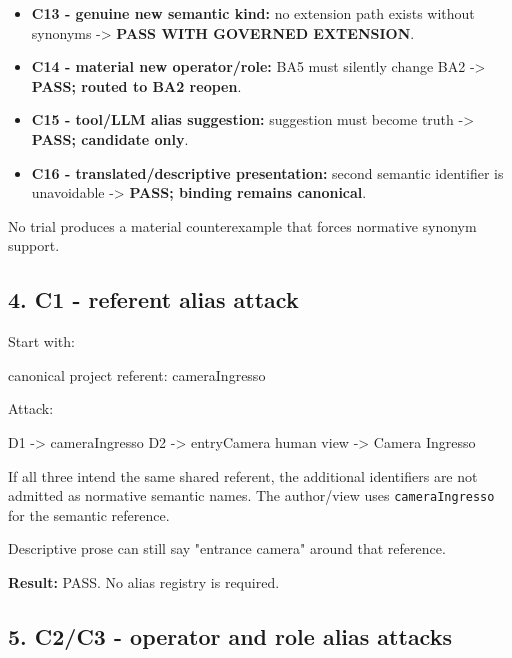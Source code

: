 \documentclass[
  10pt,
  a4paper,
]{article}
\newenvironment{Shaded}{}{}
\newcommand{\NormalTok}[1]{#1}
\begin{document}
\begin{itemize}
\item
  \textbf{C13 - genuine new semantic kind:} no extension path exists
  without synonyms -\textgreater{} \textbf{PASS WITH GOVERNED
  EXTENSION}.
\item
  \textbf{C14 - material new operator/role:} BA5 must silently change
  BA2 -\textgreater{} \textbf{PASS; routed to BA2 reopen}.
\item
  \textbf{C15 - tool/LLM alias suggestion:} suggestion must become truth
  -\textgreater{} \textbf{PASS; candidate only}.
\item
  \textbf{C16 - translated/descriptive presentation:} second semantic
  identifier is unavoidable -\textgreater{} \textbf{PASS; binding
  remains canonical}.
\end{itemize}

No trial produces a material counterexample that forces normative
synonym support.

\subsection{4. C1 - referent alias
attack}\label{4-c1---referent-alias-attack}

Start with:

\begin{Shaded}
\begin{Highlighting}[]
\NormalTok{canonical project referent:}
\NormalTok{  cameraIngresso}
\end{Highlighting}
\end{Shaded}

Attack:

\begin{Shaded}
\begin{Highlighting}[]
\NormalTok{D1 {-}\textgreater{} cameraIngresso}
\NormalTok{D2 {-}\textgreater{} entryCamera}
\NormalTok{human view {-}\textgreater{} Camera Ingresso}
\end{Highlighting}
\end{Shaded}

If all three intend the same shared referent, the additional identifiers
are not admitted as normative semantic names. The author/view uses
\texttt{cameraIngresso} for the semantic reference.

Descriptive prose can still say "entrance camera" around that reference.

\textbf{Result:} PASS. No alias registry is required.

\subsection{5. C2/C3 - operator and role alias
attacks}\label{5-c2c3---operator-and-role-alias-attacks}
\end{document}
